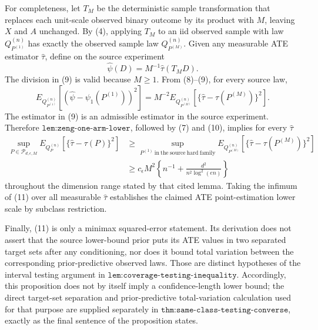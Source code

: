 For completeness, let \(T_M\) be the deterministic sample transformation
that replaces each unit-scale observed binary outcome by its product with
\(M\), leaving \(X\) and \(A\) unchanged.  By (4), applying \(T_M\) to an
iid observed sample with law \(Q_{P^{(1)}}^{(n)}\) has exactly the observed
sample law
\(Q_{P^{(M)}}^{(n)}\).  Given any measurable ATE estimator
\(\widehat\tau\), define on the source experiment
\[
 \widehat\psi(D)=M^{-1}\widehat\tau(T_M D).
\tag{9}
\]
The division in (9) is valid because \(M\ge1\).  From (8)--(9), for every
source law,
\[
 E_{Q_{P^{(1)}}^{(n)}}[(\widehat\psi-\psi_1(P^{(1)}))^2]
 =M^{-2}E_{Q_{P^{(M)}}^{(n)}}
   [\{\widehat\tau-\tau(P^{(M)})\}^2].
\tag{10}
\]
The estimator in (9) is an admissible estimator in the source experiment.
Therefore \(\texttt{lem:zeng-one-arm-lower}\), followed by (7) and (10),
implies for every \(\widehat\tau\)
\[
 \begin{aligned}
 \sup_{P\in\mathcal P_{d,\epsilon,M}}
 E_{Q_P^{(n)}}[\{\widehat\tau-\tau(P)\}^2]
 &\ge
 \sup_{P^{(1)}\ \mathrm{in\ the\ source\ hard\ family}}
 E_{Q_{P^{(M)}}^{(n)}}
 [\{\widehat\tau-\tau(P^{(M)})\}^2]\\
 &\ge c_{\epsilon}M^2
 \left\{n^{-1}+\frac{d^2}{n^2\log^2(en)}\right\}
 \end{aligned}
\tag{11}
\]
throughout the dimension range stated by that cited lemma.  Taking the
infimum of (11) over all measurable \(\widehat\tau\) establishes the claimed
ATE point-estimation lower scale by subclass restriction.

Finally, (11) is only a minimax squared-error statement.  Its derivation does
not assert that the source lower-bound prior puts its ATE values in two
separated target sets after any conditioning, nor does it bound total
variation between the corresponding prior-predictive observed laws.  Those
are distinct hypotheses of the interval testing argument in
\(\texttt{lem:coverage-testing-inequality}\).  Accordingly, this proposition
does not by itself imply a confidence-length lower bound; the direct
target-set separation and prior-predictive total-variation calculation used
for that purpose are supplied separately in
\(\texttt{thm:same-class-testing-converse}\), exactly as the final sentence
of the proposition states.
